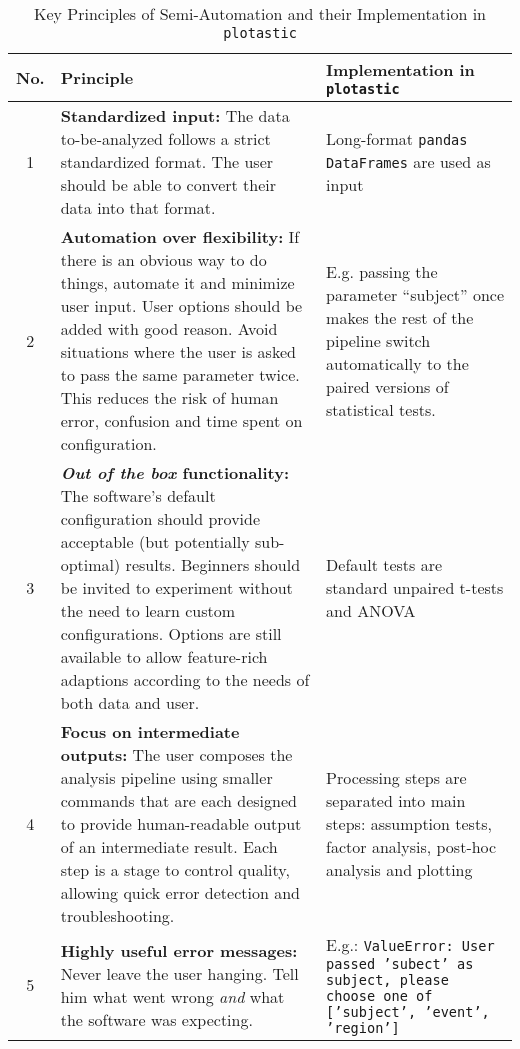 \begin{table}[h]
    \caption{Key Principles of Semi-Automation and their Implementation in \texttt{plotastic}}
    \footnotesize
    \centering
    \label{tab:semi-auto-principles}
    \begin{tabular}{|c|p{}|p{}|}
        \hline
        \textbf{No.}
         & \textbf{Principle}
         & \textbf{Implementation in \texttt{plotastic}}
        \\
        \hline
        1
         & \textbf{Standardized input:} The data to-be-analyzed follows a
        strict standardized format. The user should be able to convert their
        data into that format.
         & Long-format \texttt{pandas} \texttt{DataFrames} are used as input
        \\
        \hline
        2
         & \textbf{Automation over flexibility:} If there is an obvious way
        to do things, automate it and minimize user input. User options
        should be added with good reason. Avoid situations where the user is
        asked to pass the same parameter twice. This reduces the risk of
        human error, confusion and time spent on configuration.
         & E.g.
        passing the parameter ``subject'' once makes the rest of the
        pipeline switch automatically to the paired versions of statistical
        tests.
        \\
        \hline
        3%
         & \textbf{\emph{Out of the box} functionality:} The software's
        default configuration should provide acceptable (but potentially
        sub-optimal) results. Beginners should be invited to experiment
        without the need to learn custom configurations. Options are still
        available to allow feature-rich adaptions according to the needs of
        both data and user.%
         & Default tests are standard unpaired t-tests and ANOVA             %
        \\%
        \hline
        4
         & \textbf{Focus on intermediate outputs:} The user composes the
        analysis pipeline using smaller commands that are each designed to
        provide human-readable output of an intermediate result. Each step
        is a stage to control quality, allowing quick error detection and
        troubleshooting.
         & Processing steps are separated into main steps:
        assumption tests, factor analysis, post-hoc analysis and plotting
        \\
        \hline
        5
         & \textbf{Highly useful error messages:} Never leave the user
        hanging. Tell him what went wrong \emph{and} what the software was
        expecting.
         & E.g.: \texttt{ValueError: User passed 'subect' as
        subject, please choose one of ['subject', 'event', 'region']}        \\
        \hline
    \end{tabular}
\end{table}

